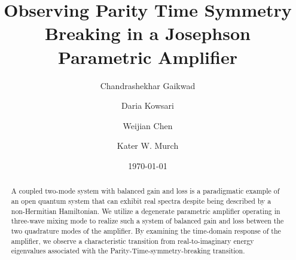 \documentclass[prl,twocolumn,english,superscriptaddress,floatfix,longbibliography]{revtex4-2}
\begin{document}
\setlength{\pdfpagewidth}{8.5in}
\setlength{\pdfpageheight}{11in}
\title{Observing Parity Time Symmetry Breaking in a Josephson Parametric Amplifier
}
\author{Chandrashekhar Gaikwad}
\author{Daria Kowsari}
\author{Weijian Chen}%
\author{Kater W. Murch}




\date{\today}
\begin{abstract}
A coupled two-mode system with balanced gain and loss is a paradigmatic example of an open quantum system that can exhibit real spectra despite being described by a non-Hermitian Hamiltonian. We utilize a degenerate parametric amplifier operating in three-wave mixing mode to realize such a system of balanced gain and loss between the two quadrature modes of the amplifier. By examining the time-domain response of the amplifier, we observe a characteristic transition from real-to-imaginary energy eigenvalues associated with the Parity-Time-symmetry-breaking transition.
\end{abstract}
\maketitle
\end{document}
